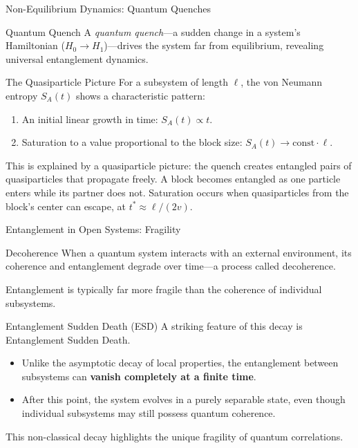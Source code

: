 \begin{frame}{Non-Equilibrium Dynamics: Quantum Quenches}
  \begin{block}{Quantum Quench}
    A \emph{quantum quench}—a sudden change in a system's Hamiltonian ($H_0 \to
    H_1$)—drives the system far from equilibrium, revealing universal
    entanglement dynamics.
  \end{block}
  \pause
  \begin{alertblock}{The Quasiparticle Picture}
    For a subsystem of length $\ell$, the von Neumann entropy $S_A(t)$ shows a
    characteristic pattern:
    \begin{enumerate}
      \item An initial \alert{linear growth} in time: $S_A(t) \propto t$.
      \item \alert{Saturation} to a value proportional to the block size:
        $S_A(t) \to \text{const} \cdot \ell$.
    \end{enumerate}
    \pause
    This is explained by a quasiparticle picture: the quench creates entangled
    pairs of quasiparticles that propagate freely.
    A block becomes entangled as one particle enters while its partner does not.
    Saturation occurs when quasiparticles from the block's center can escape, at
    $t^* \approx \ell/(2v)$.
  \end{alertblock}
\end{frame}

\begin{frame}{Entanglement in Open Systems: Fragility}
  \begin{block}{Decoherence}
    When a quantum system interacts with an external environment, its coherence
    and entanglement degrade over time—a process called decoherence.
    \pause

    Entanglement is typically far more fragile than the coherence of individual
    subsystems.
  \end{block}
  \pause
  \begin{alertblock}{Entanglement Sudden Death (ESD)}
    A striking feature of this decay is \alert{Entanglement Sudden Death}.
    \begin{itemize}
      \item Unlike the asymptotic decay of local properties, the entanglement
        between subsystems can \textbf{vanish completely at a finite time}.
      \item After this point, the system evolves in a purely separable state,
        even though individual subsystems may still possess quantum coherence.
    \end{itemize}
    This non-classical decay highlights the unique fragility of quantum
    correlations.
  \end{alertblock}
\end{frame}

